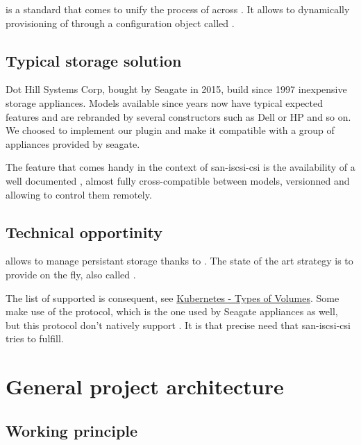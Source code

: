  is a standard that comes to unify the process of  across . It allows to dynamically provisioning of  through a configuration object called .

\subsection{Typical storage solution}

Dot Hill Systems Corp, bought by Seagate in 2015, build since 1997 inexpensive storage appliances. Models available since years now have typical expected features and are rebranded by several constructors such as Dell or HP and so on. We choosed to implement our  plugin and make it compatible with a group of appliances provided by seagate.

The feature that comes handy in the context of \gls{san-iscsi-csi} is the availability of a well documented , almost fully cross-compatible between models, versionned and allowing to control them remotely.

\subsection{Technical opportinity}

 allows to manage  persistant storage thanks to . The state of the art strategy is to provide  on the fly, also called .

The list of supported  is consequent, see \href{https://kubernetes.io/docs/concepts/storage/volumes/\#types-of-volumes}{Kubernetes - Types of Volumes}. Some  make use of the  protocol, which is the one used by Seagate appliances as well, but this protocol don't natively support . It is that precise need that \gls{san-iscsi-csi} tries to fulfill.

\section{General project architecture}

\subsection{Working principle}

